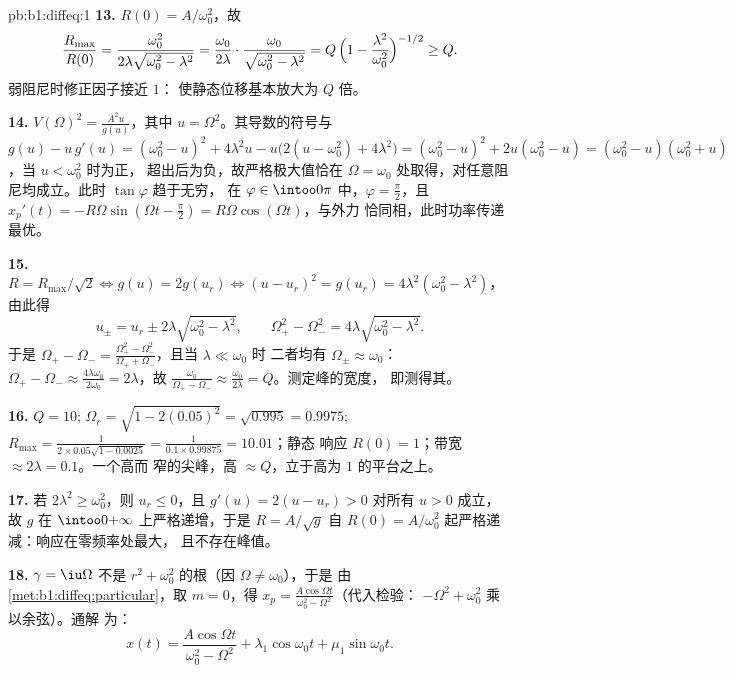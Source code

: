 \begin{solution}{pb:b1:diffeq:1}
\textbf{13.} $R(0) = A/\omega_0^2$，故
\[
\frac{R_{\max}}{R(0)}
= \frac{\omega_0^2}{2\lambda\sqrt{\omega_0^2 - \lambda^2}}
= \frac{\omega_0}{2\lambda}\cdot
\frac{\omega_0}{\sqrt{\omega_0^2 - \lambda^2}}
= Q\,\Bigl(1 - \frac{\lambda^2}{\omega_0^2}\Bigr)^{-1/2}
\geq Q .
\]
弱阻尼时修正因子接近 $1$：
使静态位移基本放大为 $Q$ 倍。

\textbf{14.} $V(\Omega)^2 = \frac{A^2 u}{g(u)}$，其中 $u =
\Omega^2$。其导数的符号与 $g(u) - u\,g'(u) =
(\omega_0^2 - u)^2 + 4\lambda^2 u - u\bigl(2(u - \omega_0^2) +
4\lambda^2\bigr) = (\omega_0^2 - u)^2 + 2u(\omega_0^2 - u) =
(\omega_0^2 - u)(\omega_0^2 + u)$，当 $u < \omega_0^2$ 时为正，
超出后为负，故严格极大值恰在 $\Omega =
\omega_0$ 处取得，对任意阻尼均成立。此时 $\tan\varphi$ 趋于无穷，
在 $\varphi \in \intoo0\pi$ 中，$\varphi = \frac\pi2$，且 $x_p'(t) =
-R\Omega\sin(\Omega t - \frac\pi2) = R\Omega\cos(\Omega t)$，与外力
恰同相，此时功率传递最优。

\textbf{15.} $R = R_{\max}/\sqrt2 \iff g(u) = 2g(u_r) \iff (u -
u_r)^2 = g(u_r) = 4\lambda^2(\omega_0^2 - \lambda^2)$，由此得
\[
u_\pm = u_r \pm 2\lambda\sqrt{\omega_0^2 - \lambda^2},
\qquad
\Omega_+^2 - \Omega_-^2 = 4\lambda\sqrt{\omega_0^2 - \lambda^2} .
\]
于是 $\Omega_+ - \Omega_- = \frac{\Omega_+^2 -
\Omega_-^2}{\Omega_+ + \Omega_-}$，且当 $\lambda \ll \omega_0$ 时
二者均有 $\Omega_\pm \approx \omega_0$：$\Omega_+ - \Omega_- \approx
\frac{4\lambda\omega_0}{2\omega_0} = 2\lambda$，故
$\frac{\omega_0}{\Omega_+ - \Omega_-} \approx
\frac{\omega_0}{2\lambda} = Q$。测定峰的宽度，
即测得其。

\textbf{16.} $Q = 10$; $\Omega_r = \sqrt{1 - 2(0.05)^2} =
\sqrt{0.995} = 0.9975$; $R_{\max} = \frac1{2 \times 0.05
\sqrt{1 - 0.0025}} = \frac1{0.1 \times 0.99875} = 10.01$；静态
响应 $R(0) = 1$；带宽 $\approx 2\lambda = 0.1$。一个高而
窄的尖峰，高 $\approx Q$，立于高为 $1$ 的平台之上。

\textbf{17.} 若 $2\lambda^2 \geq \omega_0^2$，则 $u_r \leq 0$，且
$g'(u) = 2(u - u_r) > 0$ 对所有 $u > 0$ 成立，故 $g$ 在
$\intoo0{+\infty}$ 上严格递增，于是 $R = A/\sqrt g$ 自
$R(0) = A/\omega_0^2$ 起严格递减：响应在零频率处最大，
且不存在峰值。

\textbf{18.} $\gamma = \iu\Omega$ 不是 $r^2 +
\omega_0^2$ 的根（因 $\Omega \neq \omega_0$），于是
由\cref{met:b1:diffeq:particular}，取 $m = 0$，得 $x_p =
\frac{A\cos\Omega t}{\omega_0^2 - \Omega^2}$（代入检验：
$-\Omega^2 + \omega_0^2$ 乘以余弦）。通解
为：
\[
x(t) = \frac{A\cos\Omega t}{\omega_0^2 - \Omega^2}
+ \lambda_1\cos\omega_0 t + \mu_1\sin\omega_0 t .
\]


\end{solution}
